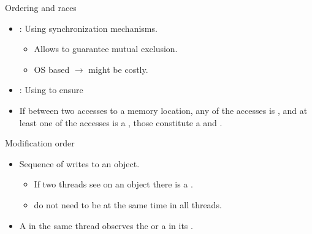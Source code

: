 \begin{frame}[t]{Ordering and races}
\begin{itemize}
  \item {}: 
        Using synchronization mechanisms.
    \begin{itemize}
      \item Allows to guarantee mutual exclusion.
      \item OS based $\rightarrow$ might be costly.
    \end{itemize}

  \item {}: Using  to
        ensure  

  \item If  between two accesses to a memory location,
        any of the accesses is , 
        and at least one of the accesses is a ,
        those constitute a  and
        .
\end{itemize}
\end{frame}

\begin{frame}[t]{Modification order}
\begin{itemize}
  \item Sequence of writes to an object.
    \begin{itemize}
      \item If two threads see  on an object
            there is a .
      \item {} do not need to be 
            at the same time in all threads.
    \end{itemize}

  \item A 
        in the same thread observes the 
        or a  in its
        .
\end{itemize}
\end{frame}

